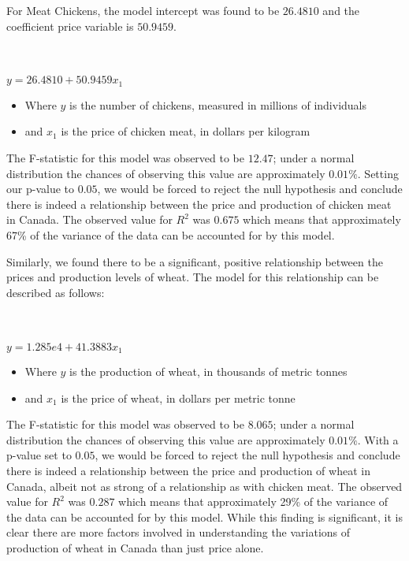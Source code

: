For Meat Chickens, the model intercept was found to be $26.4810$ and the coefficient price variable is $50.9459$.

\\~\\

\tabto{5cm} $y = 26.4810 + 50.9459x_1$

\begin{itemize}
    \item Where $y$ is the number of chickens, measured in millions of individuals
    \item and $x_1$ is the price of chicken meat, in dollars per kilogram
\end{itemize}

The F-statistic for this model was observed to be $12.47$; under a normal distribution the chances of observing this value are approximately $0.01\%$.
Setting our p-value to $0.05$, we would be forced to reject the null hypothesis and conclude there is indeed a relationship between the price and production of chicken meat in Canada.
The observed value for $R^2$ was $0.675$ which means that approximately 67\% of the variance of the data can be accounted for by this model.

Similarly, we found there to be a significant, positive relationship between the prices and production levels of wheat.
The model for this relationship can be described as follows:

\\~\\

\tabto{5cm} $y = 1.285e4 + 41.3883x_1$

\begin{itemize}
    \item Where $y$ is the production of wheat, in thousands of metric tonnes
    \item and $x_1$ is the price of wheat, in dollars per metric tonne
\end{itemize}

The F-statistic for this model was observed to be $8.065$; under a normal distribution the chances of observing this value are approximately $0.01\%$.
With a p-value set to $0.05$, we would be forced to reject the null hypothesis and conclude there is indeed a relationship between the price and production of wheat in Canada, albeit not as strong of a relationship as with chicken meat.
The observed value for $R^2$ was $0.287$ which means that approximately 29\% of the variance of the data can be accounted for by this model.
While this finding is significant, it is clear there are more factors involved in understanding the variations of production of wheat in Canada than just price alone.

